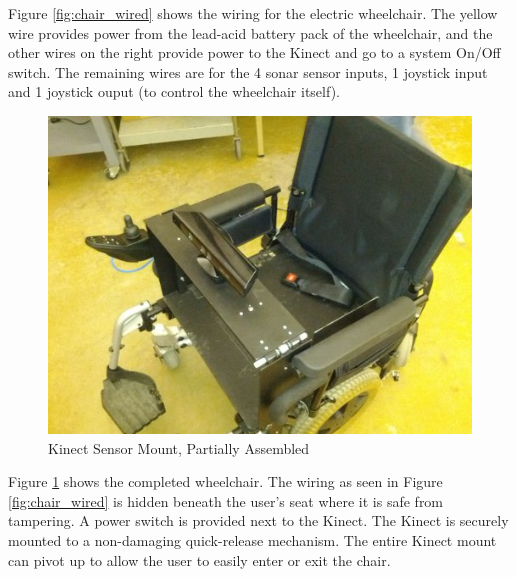 \documentclass[oneside,final,a4paper]{report}
\begin{document}
Figure \ref{fig:chair_wired} shows the wiring for the electric wheelchair. The yellow wire provides power from the lead-acid battery pack of the wheelchair, and the other wires on the right provide power to the Kinect and go to a system On/Off switch. The remaining wires are for the 4 sonar sensor inputs, 1 joystick input and 1 joystick ouput (to control the wheelchair itself).

\begin{figure}[hbt]
 \centering
 \includegraphics[scale=0.35]{mech_complete}
 \caption{Kinect Sensor Mount, Partially Assembled}
 \label{fig:mech_complete}
\end{figure}

Figure \ref{fig:mech_complete} shows the completed wheelchair. The wiring as seen in Figure \ref{fig:chair_wired} is hidden beneath the user's seat where it is safe from tampering. A power switch is provided next to the Kinect. The Kinect is securely mounted to a non-damaging quick-release mechanism. The entire Kinect mount can pivot up to allow the user to easily enter or exit the chair.
\end{document}
